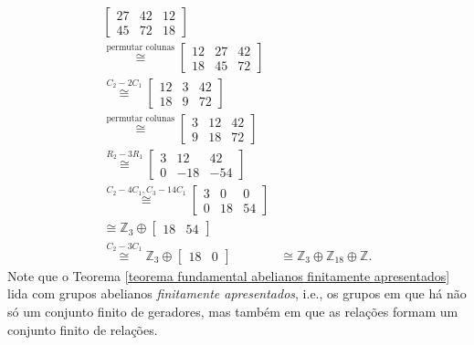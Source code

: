 \begin{align*}
\begin{bmatrix}
        	27 & 42 & 12 \\
        	45 & 72 & 18
        	\end{bmatrix}& \\ \stackrel{\text{permutar colunas}}{\cong}
        	\begin{bmatrix}
        	12 & 27 & 42 \\
        	18 & 45 & 72
        	\end{bmatrix}& \\ \stackrel{C_2 - 2C_1}{\cong}
        	\begin{bmatrix}
        	12 & 3 & 42 \\
        	18 & 9 & 72
        	\end{bmatrix}& \\ \stackrel{\text{permutar colunas}}{\cong}
        	\begin{bmatrix}
        	3 & 12 & 42 \\
        	9 & 18 & 72
        	\end{bmatrix}& \\ \stackrel{R_2 - 3R_1}{\cong}
        	\begin{bmatrix}
        	3 & 12 & 42 \\
        	0 & -18 & -54
        	\end{bmatrix}& \\ \stackrel{C_2 - 4C_1, C_3 - 14C_1}{\cong}
        	\begin{bmatrix}
        	3 & 0 & 0 \\
        	0 & 18 & 54
        	\end{bmatrix}& \\ \stackrel{}{\cong}
        	\mathbb{Z}_3\oplus\begin{bmatrix}
        	18 & 54
        	\end{bmatrix}& \\ \stackrel{C_2 - 3C_1}{\cong}
        	\mathbb{Z}_3\oplus\begin{bmatrix}
        	18 & 0
        	\end{bmatrix}& \cong \mathbb{Z}_3\oplus\mathbb{Z}_{18}\oplus\mathbb{Z}.
    	\end{align*}
    	Note que o Teorema \ref{teorema fundamental abelianos finitamente apresentados} 
    	lida com grupos abelianos \textit{finitamente apresentados}, i.e., os grupos em que há não só um 
    	conjunto finito de geradores, mas também em que as relações formam um 
    	conjunto finito de relações.
    	
